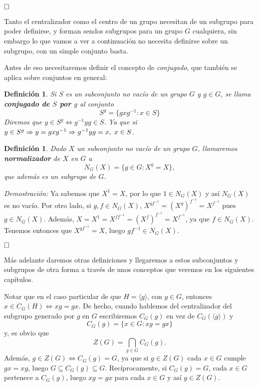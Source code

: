 \documentclass[12pt]{article}
\newtheorem{definition}[theorem]{Definición}
\begin{document}
$\hfill \square$

Tanto el centralizador como el centro de un grupo necesitan de un subgrupo para poder definirse, y forman sendos subgrupos para un grupo $G$ cualquiera, sin embargo lo que vamos a ver a continuación no necesita definirse sobre un subgrupo, con un simple conjunto basta.

Antes de eso necesitaremos definir el concepto de \textit{conjugado}, que también se aplica sobre conjuntos en general:

\begin{definition} \label{eq:conjugado} Si $S$ es un subconjunto no vacío de un grupo $G$ y $g \in G$, se llama \textbf{conjugado de $S$ por $g$} al conjunto $$S^{g} = \lbrace gxg^{-1}: x \in S\rbrace$$ Diremos que $y \in S^{g} \Leftrightarrow g^{-1}yg \in S$. Ya que si $y \in S^{g} \Rightarrow y = gxg^{-1}\Rightarrow g^{-1}yg = x, \hspace{0.1cm} x \in S$.
\end{definition}

\begin{definition}\label{eq:normalizador} Dado $X$ un subconjunto no vacío de un grupo $G$, llamaremos \textbf{normalizador} de $X$ en $G$ a $$N_{G}(X) = \lbrace g \in G : X^{g} = X\rbrace,$$ que además es un subgrupo de $G$.
\end{definition}

\emph{Demostración: } Ya sabemos que $X^{1} = X$, por lo que $1 \in N_{G}(X)$ y así $N_{G}(X)$ es no vacío. Por otro lado, si $g,f \in N_{G}(X)$, $X^{gf^{-1}} = (X^{g})^{f^{-1}} = X^{f^{-1}}$ pues $g \in N_{G}(X)$. Además, $X = X^{1} = X^{ff^{-1}} = (X^{f})^{f^{-1}} = X^{f^{-1}}$, ya que $f \in N_{G}(X)$. Tenemos entonces que $X^{gf^{-1}} = X$, luego $gf^{-1} \in N_{G}(X)$.

$\hfill \square$

Más adelante daremos otras definiciones y llegaremos a estos subconjuntos y subgrupos de otra forma a través de unos conceptos que veremos en los siguientes capítulos.

Notar que en el caso particular de que $H = \langle g \rangle$, con $g \in G$, entonces $x \in C_{G}(H)\Leftrightarrow xg = gx$. De hecho, cuando hablemos del centralizador del subgrupo generado por $g$ en $G$ escribiremos $C_{G}(g)$ en vez de $C_{G}(\langle g \rangle)$ y $$C_{G}(g) = \lbrace x \in G : xg = gx \rbrace$$ y, es obvio que $$Z(G) = \bigcap_{g \in G} C_{G}(g).$$ Además, $g \in Z(G) \Leftrightarrow C_{G}(g) = G$, ya que si $g \in Z(G)$ cada $x \in G$ cumple $gx = xg$, luego $G \subseteq C_{G}(g) \subseteq G$. Recíprocamente, si $C_{G}(g) = G$, cada $x \in G$ pertenece a $C_{G}(g)$, luego $xg = gx$ para cada $x \in G$ y así $g \in Z(G)$.
\end{document}
